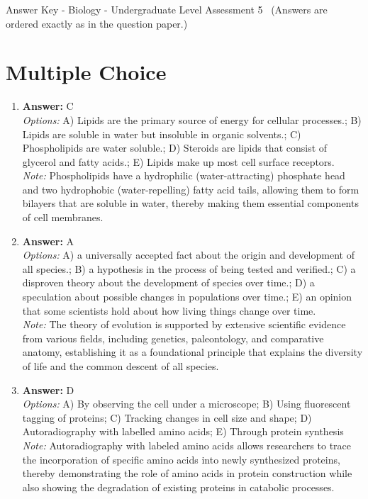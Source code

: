 \documentclass[12pt]{article}
\begin{document}
\begin{center}
Answer Key - Biology - Undergraduate Level Assessment 5 \
\small (Answers are ordered exactly as in the question paper.)
\end{center}

\section*{Multiple Choice}
\begin{enumerate}[label=\arabic*.]
\item \textbf{Answer:} C
\\ \textit{Options:} A) Lipids are the primary source of energy for cellular processes.; B) Lipids are soluble in water but insoluble in organic solvents.; C) Phospholipids are water soluble.; D) Steroids are lipids that consist of glycerol and fatty acids.; E) Lipids make up most cell surface receptors.
\\ \textit{Note:} Phospholipids have a hydrophilic (water-attracting) phosphate head and two hydrophobic (water-repelling) fatty acid tails, allowing them to form bilayers that are soluble in water, thereby making them essential components of cell membranes.
\item \textbf{Answer:} A
\\ \textit{Options:} A) a universally accepted fact about the origin and development of all species.; B) a hypothesis in the process of being tested and verified.; C) a disproven theory about the development of species over time.; D) a speculation about possible changes in populations over time.; E) an opinion that some scientists hold about how living things change over time.
\\ \textit{Note:} The theory of evolution is supported by extensive scientific evidence from various fields, including genetics, paleontology, and comparative anatomy, establishing it as a foundational principle that explains the diversity of life and the common descent of all species.
\item \textbf{Answer:} D
\\ \textit{Options:} A) By observing the cell under a microscope; B) Using fluorescent tagging of proteins; C) Tracking changes in cell size and shape; D) Autoradiography with labelled amino acids; E) Through protein synthesis
\\ \textit{Note:} Autoradiography with labeled amino acids allows researchers to trace the incorporation of specific amino acids into newly synthesized proteins, thereby demonstrating the role of amino acids in protein construction while also showing the degradation of existing proteins in catabolic processes.

\end{enumerate}
\end{document}
